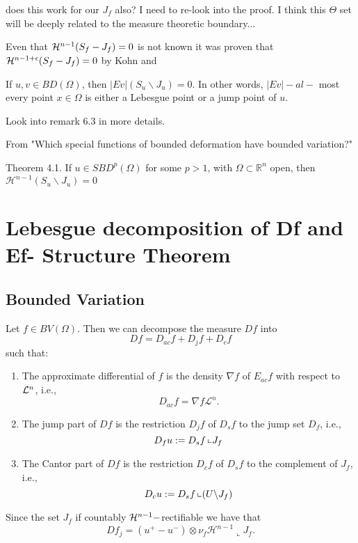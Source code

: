 \begin{question}
 does this work for our $J_f$ also? I need to re-look into the proof. I think this $\Theta$ set will be deeply related to the measure theoretic boundary...
\end{question}

Even that ${\mathcal H}^{n-1}(S_f-J_f)=0$ is not known it was proven that ${\mathcal H}^{n-1+\epsilon}(S_f-J_f)=0$ by Kohn and 
\begin{theorem}
 If $u, v \in B D(\Omega)$, then $|E v|\left(S_u \backslash J_u\right)=0$. In other words, $|E v|-a l-$ most every point $x \in \Omega$ is either a Lebesgue point or a jump point of $u$.
\end{theorem}
\begin{com}
Look into remark 6.3 in more details.
\end{com}
From "Which special functions of bounded deformation
have bounded variation?"
\begin{theorem}
Theorem 4.1. If $u \in S B D^p(\Omega)$ for some $p>1$, with $\Omega \subset \mathbb{R}^n$ open, then $\mathcal{H}^{n-1}\left(S_u \backslash J_u\right)=0$
\end{theorem}

\section{Lebesgue decomposition of Df and Ef- Structure Theorem}

\subsection{Bounded Variation}
\begin{definition} Let $f \in B V(\Omega)$. Then we can decompose the measure $Df$ into
$$D f=D _{ac}f+D_jf +D_cf$$
such that:
\begin{enumerate}
\item The approximate differential of $f$ is the density $\nabla f$ of $E_{ac} f$ with respect to ${\mathcal L}^n$, i.e., $$D_{ac} f=\nabla f \mathscr{L}^n.$$
\item The jump part of $D f$ is the restriction $D_j f$ of $D_s f$ to the jump set $D_f$, i.e., $$D_f u:=D_s f\left\llcorner J_f\right.$$
\item The Cantor part of $D f$ is the restriction $D_c f$ of $D_s f$ to the complement of $J_f$, i.e., $$D_c u:=D_s f\left\llcorner\left(U \backslash J_f\right)\right.$$
\end{enumerate}
\end{definition}
Since the set $J_f$ if countably ${\mathcal H}^{n-1}-$rectifiable we have that 
$$D f_j=\left(u^{+}-u^{-}\right) \otimes \nu_f \mathscr{H}^{n-1}\llcorner J_f.$$

